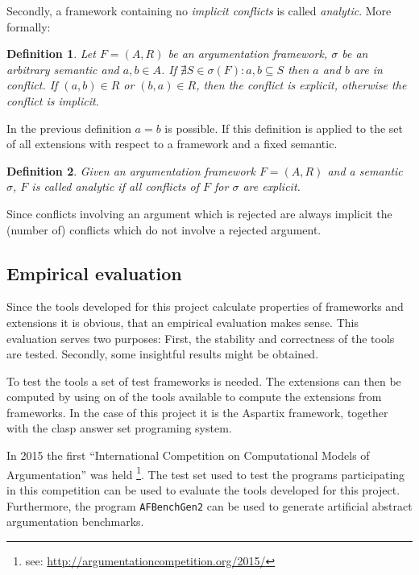\documentclass[parskip=half]{scrartcl}
\newtheorem{definition}{Definition}
\begin{document}
Secondly, a framework containing no \emph{implicit conflicts} is called
\emph{analytic}. More formally:

\begin{definition}
  Let $F=(A,R)$ be an argumentation framework, $\sigma$ be an arbitrary semantic
  and $a, b\in A$. If $\nexists S \in \sigma(F): {a,b} \subseteq S$ then $a$ and
  $b$ are in \emph{conflict}. If $(a, b) \in R$ or $(b, a)\in R$, then the
  conflict is \emph{explicit}, otherwise the conflict is \emph{implicit}.
\end{definition}

In the previous definition $a = b$ is possible. If this definition is applied to
the set of all extensions with respect to a framework and a fixed semantic.

\begin{definition}
Given an argumentation framework $F=(A,R)$ and a semantic $\sigma$, $F$ is
called \emph{analytic} if all conflicts of $F$ for $\sigma$ are explicit.
\end{definition}

Since conflicts involving an argument which is rejected are always implicit the
(number of) conflicts which do not involve a rejected argument.

\subsection{Empirical evaluation}
Since the tools developed for this project calculate properties of
frameworks and extensions it is obvious, that an empirical evaluation
makes sense. This evaluation serves two purposes: First, the stability
and correctness of the tools are tested. Secondly, some insightful
results might be obtained.

To test the tools a set of test frameworks is needed. The extensions
can then be computed by using on of the tools available to compute
the extensions from frameworks. In the case of this project it is
the Aspartix framework, together with the clasp answer set programing
system.

In 2015 the first ``International Competition on Computational
Models of Argumentation'' was held
\footnote{see: \url{http://argumentationcompetition.org/2015/}}. The
test set used to test the programs participating in this competition
can be used to evaluate the tools developed for this project. Furthermore,
the program \texttt{AFBenchGen2} can be used to generate artificial
abstract argumentation benchmarks.
\end{document}

